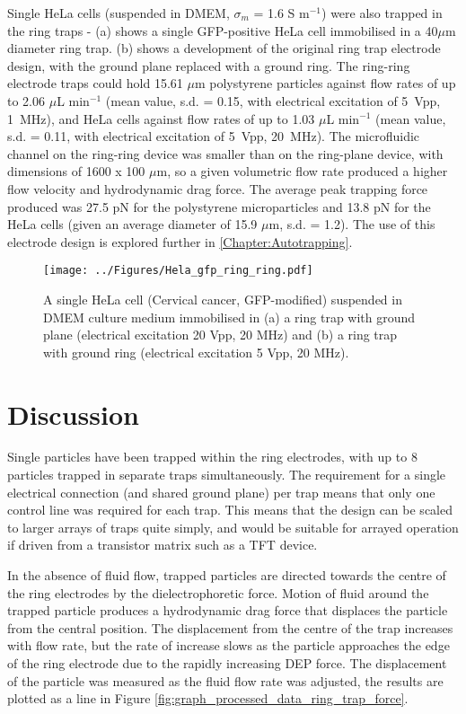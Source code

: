 Single HeLa cells (suspended in DMEM, $\sigma_{m}$ = 1.6 S m$^{-1}$) were also trapped in the ring traps -  (a) shows a single GFP-positive HeLa cell immobilised in a 40$\mu$m diameter ring trap.  (b) shows a development of the original ring trap electrode design, with the ground plane replaced with a ground ring. The ring-ring electrode traps could hold 15.61 $\mu$m polystyrene particles against flow rates of up to 2.06 $\mu$L min$^{-1}$ (mean value, s.d. = 0.15, with electrical excitation of 5~Vpp, 1~MHz), and HeLa cells against flow rates of up to 1.03 $\mu$L min$^{-1}$ (mean value, s.d. = 0.11, with electrical excitation of 5~Vpp, 20~MHz). The microfluidic channel on the ring-ring device was smaller than on the ring-plane device, with dimensions of 1600 x 100 $\mu$m, so a given volumetric flow rate produced a higher flow velocity and hydrodynamic drag force. The average peak trapping force produced was 27.5 pN for the polystyrene microparticles and 13.8 pN for the HeLa cells (given an average diameter of 15.9 $\mu$m, s.d. = 1.2). The use of this electrode design is explored further in \cref{Chapter:Autotrapping}.

\begin{figure}
 \centering
 \texttt{[image: ../Figures/Hela\_gfp\_ring\_ring.pdf]}
 \caption[Single HeLa cells immobilised in the ring electrodes.]{A single HeLa cell (Cervical cancer, GFP-modified) suspended in DMEM culture medium immobilised in (a) a ring trap with ground plane (electrical excitation 20 Vpp, 20 MHz) and (b) a ring trap with ground ring (electrical excitation 5 Vpp, 20 MHz).}
 \label{fig:Hela_cell_GFP_ring_trap}
\end{figure}


\section{Discussion}

Single particles have been trapped within the ring electrodes, with up to 8 particles trapped in separate traps simultaneously. The requirement for a single electrical connection (and shared ground plane) per trap means that only one control line was required for each trap. This means that the design can be scaled to larger arrays of traps quite simply, and would be suitable for arrayed operation if driven from a transistor matrix such as a TFT device.

In the absence of fluid flow, trapped particles are directed towards the centre of the ring electrodes by the dielectrophoretic force. Motion of fluid around the trapped particle produces a hydrodynamic drag force that displaces the particle from the central position. The displacement from the centre of the trap increases with flow rate, but the rate of increase slows as the particle approaches the edge of the ring electrode due to the rapidly increasing DEP force. The displacement of the particle was measured as the fluid flow rate was adjusted, the results are plotted as a line in Figure \ref{fig:graph_processed_data_ring_trap_force}.

